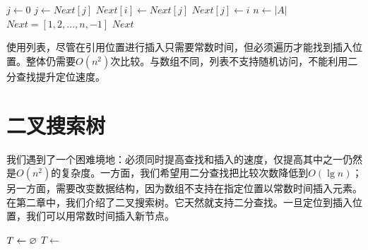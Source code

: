 \documentclass[b5paper]{ctexart}
\begin{document}
\begin{algorithmic}[1]
  \State $j \gets 0$ 
    \State $j \gets Next[j]$
  \EndWhile
  \State $Next[i] \gets Next[j]$
  \State $Next[j] \gets i$
\EndFunction
\Statex
{}
  \State $n \gets |A|$
  \State $Next = [1, 2, ..., n, -1]$ 
    \State {}
  \EndFor
  \State \Return $Next$
\EndFunction
\end{algorithmic}

使用列表，尽管在引用位置进行插入只需要常数时间，但必须遍历才能找到插入位置。整体仍需要$O(n^2)$次比较。与数组不同，列表不支持随机访问，不能利用二分查找提升定位速度。

\begin{Exercise}\label{ex:list-index-array-reorder}
\end{Exercise}

\begin{Answer}[ref = {ex:list-index-array-reorder}]
\end{Answer}

\section{二叉搜索树}

我们遇到了一个困难境地：必须同时提高查找和插入的速度，仅提高其中之一仍然是$O(n^2)$的复杂度。一方面，我们希望用二分查找把比较次数降低到$O(\lg n)$；另一方面，需要改变数据结构，因为数组不支持在指定位置以常数时间插入元素。在第二章中，我们介绍了二叉搜索树。它天然就支持二分查找。一旦定位到插入位置，我们可以用常数时间插入新节点。

\begin{algorithmic}[1]
  \State $T \gets \varnothing$
    \State $T \gets $ 
  \EndFor
  \State \Return {}
\EndFunction
\end{algorithmic}
\end{document}

